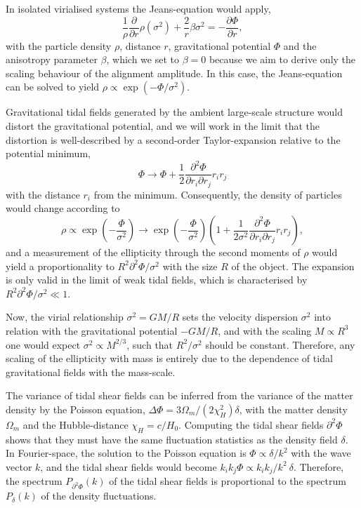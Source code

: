 \documentclass[a4paper,fleqn,usenatbib]{mnras}
\begin{document}
In isolated virialised systems the Jeans-equation would apply,
\begin{equation}
\frac{1}{\rho}\frac{\partial}{\partial r}\rho(\sigma^2) + \frac{2}{r}\beta\sigma^2 = 
-\frac{\partial\Phi}{\partial r},
\end{equation}
with the particle density $\rho$, distance $r$, gravitational potential $\Phi$ and the anisotropy parameter $\beta$, which we set to $\beta=0$ because we aim to derive only the scaling behaviour of the alignment amplitude. In this case, the Jeans-equation can be solved to yield $\rho\propto\exp(-\Phi/\sigma^2)$.

Gravitational tidal fields generated by the ambient large-scale structure would distort the gravitational potential, and we will work in the limit that the distortion is well-described by a second-order Taylor-expansion relative to the potential minimum,
\begin{equation}
\Phi\rightarrow\Phi+\frac{1}{2}\frac{\partial^2\Phi}{\partial r_i\partial r_j}r_ir_j
\end{equation}
with the distance $r_i$ from the minimum. Consequently, the density of particles would change according to
\begin{equation}
\rho\propto\exp\left(-\frac{\Phi}{\sigma^2}\right) \rightarrow 
\exp\left(-\frac{\Phi}{\sigma^2}\right)\left(1+\frac{1}{2\sigma^2}\frac{\partial^2\Phi}{\partial r_i\partial r_j}r_ir_j\right),
\end{equation}
and a measurement of the ellipticity through the second moments of $\rho$ would yield a proportionality to $R^2\partial^2\Phi/\sigma^2$ with the size $R$ of the object. The expansion is only valid in the limit of weak tidal fields, which is characterised by $R^2\partial^2\Phi/\sigma^2\ll 1$.

Now, the virial relationship $\sigma^2 = GM/R$ sets the velocity dispersion $\sigma^2$ into relation with the gravitational potential $-GM/R$, and with the scaling $M\propto R^3$ one would expect $\sigma^2\propto M^{2/3}$, such that $R^2/\sigma^2$ should be constant. Therefore, any scaling of the ellipticity with mass is entirely due to the dependence of tidal gravitational fields with the mass-scale.

The variance of tidal shear fields can be inferred from the variance of the matter density by the Poisson equation, $\Delta\Phi = 3\Omega_m/(2\chi_H^2)\delta$, with the matter density $\Omega_m$ and the Hubble-distance $\chi_H=c/H_0$. Computing the tidal shear fields $\partial^2\Phi$ shows that they must have the same fluctuation statistics as the density field $\delta$. In Fourier-space, the solution to the Poisson equation is $\Phi \propto \delta/k^2$ with the wave vector $k$, and the tidal shear fields would become $k_ik_j\Phi \propto k_ik_j/k^2\:\delta$. Therefore, the spectrum $P_{\partial^2\Phi}(k)$ of the tidal shear fields is proportional to the spectrum $P_\delta(k)$ of the density fluctuations.
\end{document}
